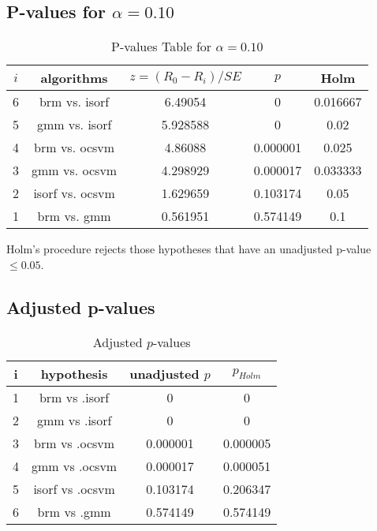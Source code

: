 \documentclass[a4paper,10pt]{article}
\begin{document}
\begin{landscape}
\pagebreak

\subsection{P-values for $\alpha=0.10$}

\begin{table}[!htp]
\centering\scriptsize
\begin{tabular}{ccccc}
$i$&algorithms&$z=(R_0 - R_i)/SE$&$p$&Holm\\
\hline6&brm vs. isorf&6.49054&0&0.016667\\
5&gmm vs. isorf&5.928588&0&0.02\\
4&brm vs. ocsvm&4.86088&0.000001&0.025\\
3&gmm vs. ocsvm&4.298929&0.000017&0.033333\\
2&isorf vs. ocsvm&1.629659&0.103174&0.05\\
1&brm vs. gmm&0.561951&0.574149&0.1\\
\hline
\end{tabular}
\caption{P-values Table for $\alpha=0.10$}
\end{table}Holm's procedure rejects those hypotheses that have an unadjusted p-value $\le0.05$.

\pagebreak

\subsection{Adjusted p-values}

\begin{table}[!htp]
\centering\scriptsize
\begin{tabular}{cccc}
i&hypothesis&unadjusted $p$&$p_{Holm}$\\
\hline1&brm vs .isorf&0&0\\
2&gmm vs .isorf&0&0\\
3&brm vs .ocsvm&0.000001&0.000005\\
4&gmm vs .ocsvm&0.000017&0.000051\\
5&isorf vs .ocsvm&0.103174&0.206347\\
6&brm vs .gmm&0.574149&0.574149\\
\hline
\end{tabular}
\caption{Adjusted $p$-values}
\end{table}

\end{landscape}
\end{document}
